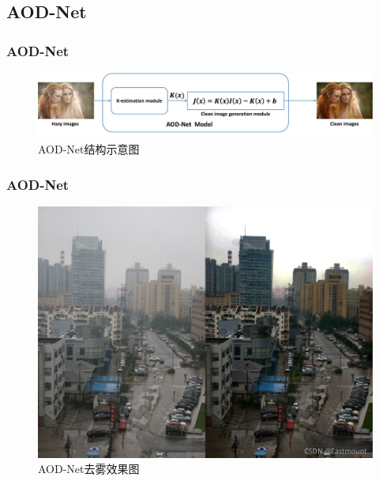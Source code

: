     \subsection{AOD-Net}
    \begin{frame}
    \frametitle{AOD-Net}
    \begin{figure}[h]
      \centering
      \includegraphics[width=\linewidth]{figures/pic11.png}
      \caption{AOD-Net结构示意图}
    \end{figure}
    \end{frame}

    \begin{frame}
      \frametitle{AOD-Net}
      \begin{figure}[h]
        \centering
        \includegraphics[width=0.8\linewidth]{figures/pic13.jpg}
        \caption{AOD-Net去雾效果图}
      \end{figure}
    \end{frame}

